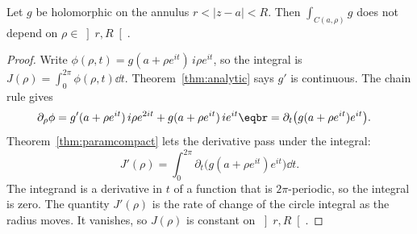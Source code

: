 \begin{lemma}\label{lem:annulus}
Let $g$ be holomorphic on the annulus $r<|z-a|<R$. Then $\int_{C(a,\rho)}g$ does not depend on $\rho\in\left]r,R\right[$.
\end{lemma}
\begin{proof}
Write $\phi(\rho,t)=g(a+\rho e^{it})\,i\rho e^{it}$, so the integral is $J(\rho)=\int_0^{2\pi}\phi(\rho,t)\dd t$. Theorem~\ref{thm:analytic} says $g'$ is continuous. The chain rule gives
\[
\begin{aligned}\partial_\rho\phi&=g'(a+\rho e^{it})\,i\rho e^{2it}+g(a+\rho e^{it})\,ie^{it}\eqbr=\partial_t\bigl(g(a+\rho e^{it})e^{it}\bigr).\end{aligned}
\]
Theorem~\ref{thm:paramcompact} lets the derivative pass under the integral:
\[
J'(\rho)=\int_0^{2\pi}\partial_t\bigl(g(a+\rho e^{it})e^{it}\bigr)\dd t.
\]
The integrand is a derivative in $t$ of a function that is $2\pi$-periodic, so the integral is zero. The quantity $J'(\rho)$ is the rate of change of the circle integral as the radius moves. It vanishes, so $J(\rho)$ is constant on $\left]r,R\right[$.
\end{proof}

